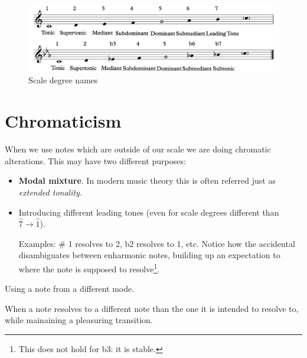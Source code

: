 \begin{figure}
    \begin{center}
        \includegraphics[width=\textwidth]{img/degrees}
        \caption{Scale degree names}
    \end{center}
\end{figure}

\section{Chromaticism}
When we use notes which are outside of our scale we are doing chromatic alterations. This may have two different purposes:
\begin{itemize}
    \item \textbf{Modal mixture}. In modern music theory this is often referred just as \emph{extended tonality}.
    \item Introducing different leading tones (even for scale degrees different than $\hat 7 \to \hat 1$).
    
    Examples: \# 1 resolves to 2, b2 resolves to 1, etc. Notice how the accidental disambiguates between enharmonic notes, building up an expectation to where the note is supposed to resolve\footnote{This does not hold for b3: it is stable.}.
\end{itemize}

\begin{definition}
    Using a note from a different mode.
\end{definition}

\begin{definition}[Sublimation]
    When a note resolves to a different note than the one it is intended to resolve to, while mainaining a pleasuring transition.
\end{definition}